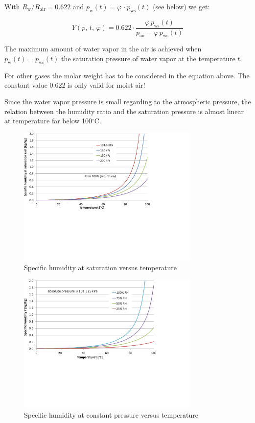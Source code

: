 \documentclass[11pt,a4paper,english,twoside]{scrreprt}
\newcommand{\gradC}{${}^\circ$C}      %
\begin{document}
With $R_\text{w} / R_\text{air} = 0.622$ and $p_\text{w}(t) = \varphi\,\cdot p_\text{ws}(t)$ (see below) we get:

\begin{equation}
  \label{eqn:Yphi}
  Y(p,\,t,\,\varphi) = 0.622 \cdot \frac{\varphi\, p_\text{ws}(t) }{p_\text{air} - \varphi\, p_\text{ws}(t)}
\end{equation}


The maximum amount of water vapor in the air is achieved when $p_\text{w}(t) =p_\text{ws}(t)$ the saturation pressure of water vapor at the temperature $t$.

For other gases the molar weight has to be considered in the equation above. The constant value 0.622 is only valid for moist air!

Since the water vapor pressure is small regarding to the atmospheric pressure, the relation between the humidity ratio and the saturation pressure is almost linear at temperature far below 100\gradC.

\begin{figure}
  \centering
  \includegraphics*[width=0.8\textwidth,angle=0]{FCF_Diag_Y.pdf}
  \caption[Specific humidity at saturation versus temperature]{Specific humidity at saturation versus temperature}
\end{figure}

\begin{figure}
  \centering
  \includegraphics*[width=0.8\textwidth,angle=0]{FCF_Diag_Y2.pdf}
  \caption[Specific humidity at constant pressure versus temperature]{Specific humidity at constant pressure versus temperature} 
\end{figure}
\end{document}
